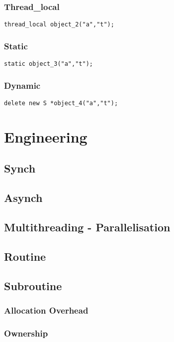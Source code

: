 \subsection{Thread\_local}
\begin{verbatim}
thread_local object_2("a","t");
\end{verbatim}

\subsection{Static}
\begin{verbatim}
static object_3("a","t");
\end{verbatim}

\subsection{Dynamic}

\begin{verbatim}
delete new S *object_4("a","t");
\end{verbatim}


\chapter{Engineering}

\section{Synch}
\section{Asynch}
\section{Multithreading - Parallelisation}

\section{Routine}
\section{Subroutine}


\subsection{Allocation Overhead}
\subsection{Ownership}

